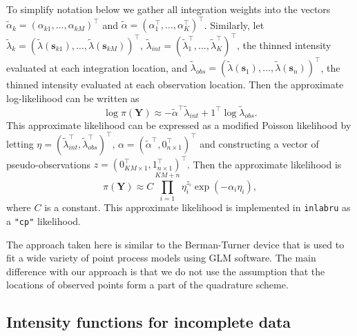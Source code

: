 \documentclass{statsoc}
\newcommand{\bs}{\mathbf{s}}
\newcommand{\bm}{\boldsymbol}  %
\newcommand{\tl}{\tilde{\lambda}}   %
\begin{document}
To simplify notation below we gather all integration weights into the vectors $\tilde{\alpha}_{k} = (\alpha_{k1}, \ldots, \alpha_{kM})^\intercal$ and $\tilde{\alpha} = (\alpha_1^\intercal, \ldots, \alpha_K^\intercal)^\intercal$.  Similarly, let $\tl_k = (\tl(\bs_{k1}), \ldots, \tl(\bs_{kM}))^\intercal$, $\tl_{int} = (\tl_1^\intercal, \ldots, \tl_K^\intercal)^\intercal$, the thinned intensity evaluated at each integration location, and $\tl_{obs} = (\tl(\bs_1), \ldots, \tl(\bs_n))^\intercal$, the thinned intensity evaluated at each observation location.  Then the approximate log-likelihood can be written as
\begin{equation}
\label{approx-log-likelihood}
	\log \pi(\bm{Y}) \approx - \tilde{\alpha}^\intercal \tl_{int} + 1^\intercal\log\tl_{obs}.
\end{equation}
This approximate likelihood can be expressed as a modified Poisson likelihood by letting $\eta = (\tl_{int}^\intercal, \tl_{obs}^\intercal)^\intercal$,
$\alpha = (\tilde{\alpha}^\intercal, 0_{n \times 1}^\intercal)^\intercal$ and constructing a vector of pseudo-observations $z = (0_{KM\times 1}^\intercal, 1_{n \times 1}^\intercal)^\intercal$.  Then the approximate likelihood is
\begin{equation}
\pi(\bm{Y}) \approx C \prod\limits_{i=1}^{KM + n} \eta_i^{z_i}\exp(-\alpha_i\eta_i),
\end{equation}
where $C$ is a constant.  This approximate likelihood is implemented in \texttt{inlabru} as a \texttt{"cp"} likelihood.  

The approach taken here is similar to the Berman-Turner device \citep{baddeley_practical_2000, berman_approximating_1992} that is used to fit a wide variety of point process models using GLM software.  The main difference with our approach is that we do not use the assumption that the locations of observed points form a part of the quadrature scheme.

\subsection{Intensity functions for incomplete data}
\end{document}
